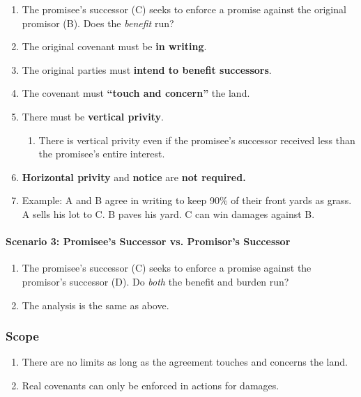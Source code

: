 \begin{enumerate}
    \item The promisee's successor (C) seeks to enforce a promise against the 
    original promisor (B). Does the \emph{benefit} run?
    \item The original covenant must be \textbf{in writing}.
    \item The original parties must \textbf{intend to benefit successors}.
    \item The covenant must \textbf{``touch and concern''} the land.
    \item There must be \textbf{vertical privity}.
    \begin{enumerate}
        \item There is vertical privity even if the promisee's successor 
        received less than the promisee's entire interest.
    \end{enumerate}
    \item \textbf{Horizontal privity} and \textbf{notice} are \textbf{not 
    required.}
    \item Example: A and B agree in writing to keep 90\% of their front yards 
    as grass. A sells his lot to C. B paves his yard. C can win damages 
    against B.
\end{enumerate}

\paragraph{Scenario 3: Promisee's Successor vs. Promisor's Successor}

\begin{enumerate}
    \item The promisee's successor (C) seeks to enforce a promise against the 
    promisor's successor (D). Do \emph{both} the benefit and burden run?
    \item The analysis is the same as above.
\end{enumerate}

\subsubsection{Scope}

\begin{enumerate}
    \item There are no limits as long as the agreement touches and concerns 
    the land.
    \item Real covenants can only be enforced in actions for damages.
\end{enumerate}

